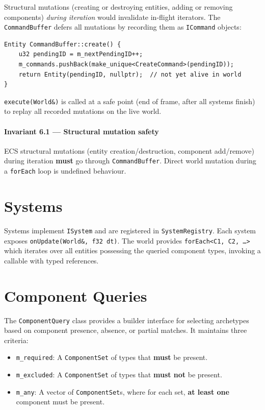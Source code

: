 Structural mutations (creating or destroying entities, adding or removing
components) \emph{during iteration} would invalidate in-flight iterators.
The \texttt{CommandBuffer} defers all mutations by recording them as
\texttt{ICommand} objects:

\begin{lstlisting}[caption={Deferred entity creation}]
Entity CommandBuffer::create() {
    u32 pendingID = m_nextPendingID++;
    m_commands.pushBack(make_unique<CreateCommand>(pendingID));
    return Entity(pendingID, nullptr);  // not yet alive in world
}
\end{lstlisting}

\texttt{execute(World\&)} is called at a safe point (end of frame,
after all systems finish) to replay all recorded mutations on the live world.


\paragraph{Invariant 6.1 --- Structural mutation safety}

  ECS structural mutations (entity creation/destruction, component
  add/remove) during iteration \textbf{must} go through
  \texttt{CommandBuffer}. Direct world mutation during a
  \texttt{forEach} loop is undefined behaviour.



\section{Systems}

Systems implement \texttt{ISystem} and are registered in
\texttt{SystemRegistry}. Each system exposes \texttt{onUpdate(World\&, f32 dt)}.
The world provides \texttt{forEach<C1, C2, \ldots>} which iterates over all
entities possessing the queried component types, invoking a callable
with typed references.

\section{Component Queries}

The \texttt{ComponentQuery} class provides a builder interface for selecting archetypes
based on component presence, absence, or partial matches. It maintains three criteria:
\begin{itemize}
    \item \texttt{m\_required}: A \texttt{ComponentSet} of types that \textbf{must} be present.
    \item \texttt{m\_excluded}: A \texttt{ComponentSet} of types that \textbf{must not} be present.
    \item \texttt{m\_any}: A vector of \texttt{ComponentSet}s, where for each set, \textbf{at least one} component must be present.
\end{itemize}

